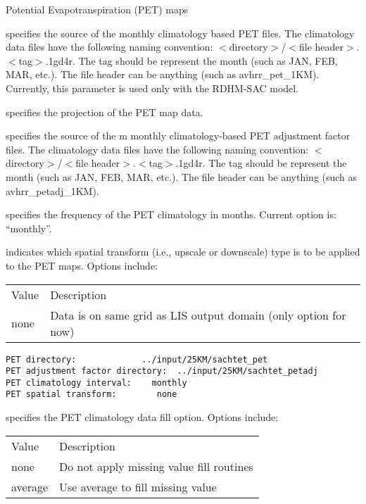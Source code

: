  
 Potential Evapotranspiration (PET) maps

  specifies the source of the monthly climatology based
 PET files. The climatology data files have the following
 naming convention: $<$directory$>$/$<$file header$>$.$<$tag$>$.1gd4r.
 The tag should be represent the month (such as JAN, FEB, MAR, etc.).
 The file header can be anything (such as avhrr\_pet\_1KM).
 Currently, this parameter is used only with the RDHM-SAC model.

  specifies the projection of the
 PET map data.

  specifies the source of the m
 monthly climatology-based PET adjustment factor files.
 The climatology data files have the following
 naming convention: $<$directory$>$/$<$file header$>$.$<$tag$>$.1gd4r.
 The tag should be represent the month (such as JAN, FEB, MAR, etc.).
 The file header can be anything (such as avhrr\_petadj\_1KM).

  specifies the frequency of the
  PET climatology in months. Current option is:  ``monthly''.

  indicates which spatial transform
 (i.e., upscale or downscale) type is to be applied to the PET 
 maps.  Options include:

 \begin{tabular}{ll}
 Value   & Description                                   \\
 none    & Data is on same grid as LIS output domain (only option for now) \\
 \end{tabular}
 

 \begin{Verbatim}[frame=single]
PET directory:             ../input/25KM/sachtet_pet
PET adjustment factor directory:  ../input/25KM/sachtet_petadj
PET climatology interval:    monthly
PET spatial transform:        none
 \end{Verbatim}

 
  specifies the PET climatology
 data fill option.  Options include:

 \begin{tabular}{ll}
 Value   & Description                              \\
 none    & Do not apply missing value fill routines \\
 average & Use average to fill missing value        \\
 \end{tabular}

